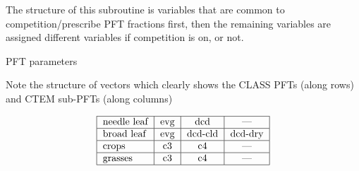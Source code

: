 The structure of this subroutine is variables that are common to competition/prescribe P\+F\+T fractions first, then the remaining variables are assigned different variables if competition is on, or not.

P\+F\+T parameters

Note the structure of vectors which clearly shows the C\+L\+A\+S\+S P\+F\+Ts (along rows) and C\+T\+E\+M sub-\/\+P\+F\+Ts (along columns)

\[ \begin{tabular} { | l | c | c | c | } \hline needle leaf & evg & dcd & --- \\ \hline broad leaf & evg & dcd-cld & dcd-dry \\ \hline crops & c3 & c4 & --- \\ \hline grasses & c3 & c4 & --- \\ \hline \end{tabular} \] 